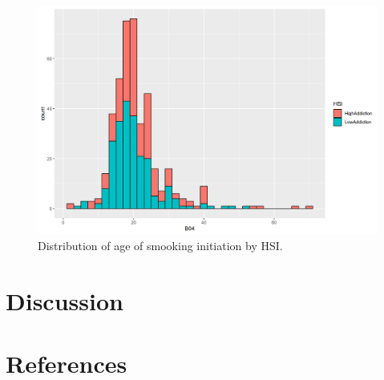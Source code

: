 \documentclass[
  letterpaper,
  DIV=11,
  numbers=noendperiod]{scrartcl}
\begin{document}
\begin{figure}

{\centering \includegraphics[width=9.44in,height=\textheight]{../../../results/figure4.png}

}

\caption{\label{fig-figure4}Distribution of age of smooking initiation
by HSI.}

\end{figure}

\newpage{}

\hypertarget{discussion}{%
\section{Discussion}\label{discussion}}

\newpage{}

\hypertarget{references}{%
\section{References}\label{references}}
\end{document}
